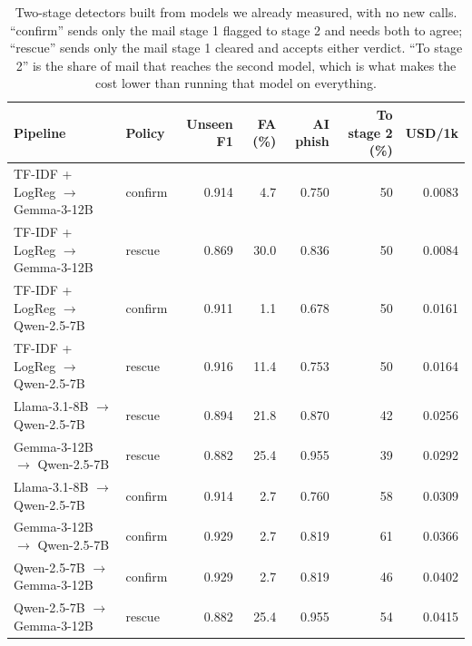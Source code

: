 \begin{table}[t]
\caption{Two-stage detectors built from models we already measured, with no new calls. ``confirm'' sends only the mail stage 1 flagged to stage 2 and needs both to agree; ``rescue'' sends only the mail stage 1 cleared and accepts either verdict. ``To stage 2'' is the share of mail that reaches the second model, which is what makes the cost lower than running that model on everything.}
\label{tab:cascade}
\centering\footnotesize
\setlength{\tabcolsep}{3pt}
\begin{tabular}{llrrrrr}
\toprule
Pipeline & Policy & Unseen F1 & FA (\%) & AI phish & To stage 2 (\%) & USD/1k \\
\midrule
TF-IDF + LogReg $\rightarrow$ Gemma-3-12B & confirm & 0.914 & 4.7 & 0.750 & 50 & 0.0083 \\
TF-IDF + LogReg $\rightarrow$ Gemma-3-12B & rescue & 0.869 & 30.0 & 0.836 & 50 & 0.0084 \\
TF-IDF + LogReg $\rightarrow$ Qwen-2.5-7B & confirm & 0.911 & 1.1 & 0.678 & 50 & 0.0161 \\
TF-IDF + LogReg $\rightarrow$ Qwen-2.5-7B & rescue & 0.916 & 11.4 & 0.753 & 50 & 0.0164 \\
Llama-3.1-8B $\rightarrow$ Qwen-2.5-7B & rescue & 0.894 & 21.8 & 0.870 & 42 & 0.0256 \\
Gemma-3-12B $\rightarrow$ Qwen-2.5-7B & rescue & 0.882 & 25.4 & 0.955 & 39 & 0.0292 \\
Llama-3.1-8B $\rightarrow$ Qwen-2.5-7B & confirm & 0.914 & 2.7 & 0.760 & 58 & 0.0309 \\
Gemma-3-12B $\rightarrow$ Qwen-2.5-7B & confirm & 0.929 & 2.7 & 0.819 & 61 & 0.0366 \\
Qwen-2.5-7B $\rightarrow$ Gemma-3-12B & confirm & 0.929 & 2.7 & 0.819 & 46 & 0.0402 \\
Qwen-2.5-7B $\rightarrow$ Gemma-3-12B & rescue & 0.882 & 25.4 & 0.955 & 54 & 0.0415 \\
\bottomrule
\end{tabular}
\end{table}
